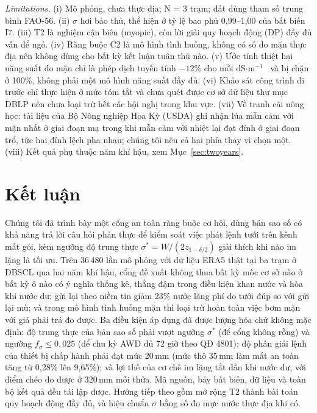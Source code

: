 \documentclass[10pt]{article}
\begin{document}
\emph{Limitations.} (i) Mô phỏng, chưa thực địa; N = 3 trạm; đất dùng tham số trung bình FAO-56. (ii) $\sigma$ hơi bảo thủ, thể hiện ở tỷ lệ bao phủ 0,99--1,00 của bất biến I7. (iii) T2 là nghiệm cận biên (myopic), còn lời giải quy hoạch động (DP) đầy đủ vẫn để ngỏ. (iv) Ràng buộc C2 là mô hình tình huống, không có số đo mặn thực địa nên không dùng cho bất kỳ kết luận tuân thủ nào. (v) Ước tính thiệt hại năng suất do mặn chỉ là phép dịch tuyến tính $-12\%$ cho mỗi dS$\cdot$m$^{-1}$~\cite{usdaP1837} và bị chặn ở 100\%, không phải một mô hình năng suất đầy đủ. (vi) Khảo sát công trình đi trước chỉ thực hiện ở mức tóm tắt và chưa quét được cơ sở dữ liệu thư mục DBLP nên chưa loại trừ hết các hội nghị trong khu vực. (vii) Về tranh cãi nông học: tài liệu của Bộ Nông nghiệp Hoa Kỳ (USDA) ghi nhận lúa mẫn cảm với mặn nhất ở giai đoạn mạ trong khi mẫn cảm với nhiệt lại đạt đỉnh ở giai đoạn trổ, tức hai đỉnh lệch pha nhau; chúng tôi nêu cả hai phía thay vì chọn một. (viii) Kết quả phụ thuộc năm khí hậu, xem Mục~\ref{sec:twoyears}.

\section{Kết luận}

Chúng tôi đã trình bày một cổng an toàn ràng buộc cơ hội, dùng bản sao số có khả năng trả lời câu hỏi phản thực để kiểm soát việc phát lệnh tưới trên kênh mất gói, kèm ngưỡng độ trung thực $\sigma^{*}=W/(2z_{1-\delta/2})$ giải thích khi nào im lặng là tối ưu. Trên 36\,480 lần mô phỏng với dữ liệu ERA5 thật tại ba trạm ở ĐBSCL qua hai năm khí hậu, cổng đề xuất không thua bất kỳ mốc cơ sở nào ở bất kỳ ô nào có ý nghĩa thống kê, thắng đậm trong điều kiện khan nước và hòa khi nước dư; gửi lại theo niềm tin giảm 23\% nước lãng phí do tưới đúp so với gửi lại mù; và trong mô hình tình huống mặn thì loại trừ hoàn toàn việc bơm mặn với giá phải trả đo được. Ba điều kiện áp dụng đã được lượng hóa chứ không mặc định: độ trung thực của bản sao số phải vượt ngưỡng $\sigma^{*}$ (để cổng không rỗng) và ngưỡng $f_\sigma \le 0{,}025$ (để chu kỳ AWD đủ 72 giờ theo QĐ 4801); độ phân giải lệnh của thiết bị chấp hành phải đạt mức 20\,mm (mức thô 35\,mm làm mất an toàn tăng từ 0,28\% lên 9,65\%); và lợi thế của cơ chế im lặng tắt dần khi nước dư, với điểm chéo đo được ở 320\,mm mỗi thửa. Mã nguồn, bảy bất biến, dữ liệu và toàn bộ kết quả đều tái lập được. Hướng tiếp theo gồm mở rộng T2 thành bài toán quy hoạch động đầy đủ, và hiệu chuẩn $\sigma$ bằng số đo mực nước thực địa khi có.
\end{document}
